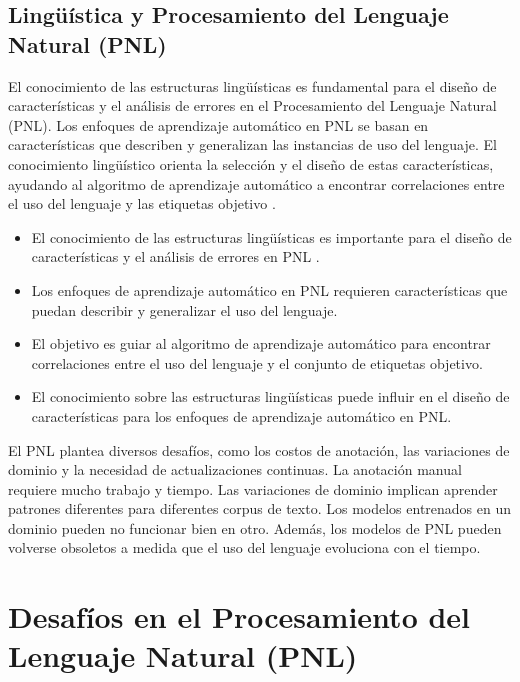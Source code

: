 \subsection{Lingüística y Procesamiento del Lenguaje Natural (PNL)}

El conocimiento de las estructuras lingüísticas es fundamental para el diseño de características y el análisis de errores en el Procesamiento del Lenguaje Natural (PNL). Los enfoques de aprendizaje automático en PNL se basan en características que describen y generalizan las instancias de uso del lenguaje. El conocimiento lingüístico orienta la selección y el diseño de estas características, ayudando al algoritmo de aprendizaje automático a encontrar correlaciones entre el uso del lenguaje y las etiquetas objetivo \cite{bender2013linguistic}.

\begin{itemize}
  \item El conocimiento de las estructuras lingüísticas es importante para el diseño de características y el análisis de errores en PNL \cite{bender2013linguistic}.
  \item Los enfoques de aprendizaje automático en PNL requieren características que puedan describir y generalizar el uso del lenguaje.
  \item El objetivo es guiar al algoritmo de aprendizaje automático para encontrar correlaciones entre el uso del lenguaje y el conjunto de etiquetas objetivo.
  \item El conocimiento sobre las estructuras lingüísticas puede influir en el diseño de características para los enfoques de aprendizaje automático en PNL.
\end{itemize}

El PNL plantea diversos desafíos, como los costos de anotación, las variaciones de dominio y la necesidad de actualizaciones continuas. La anotación manual requiere mucho trabajo y tiempo. Las variaciones de dominio implican aprender patrones diferentes para diferentes corpus de texto. Los modelos entrenados en un dominio pueden no funcionar bien en otro. Además, los modelos de PNL pueden volverse obsoletos a medida que el uso del lenguaje evoluciona con el tiempo.




\section{Desafíos en el Procesamiento del Lenguaje Natural (PNL)}

